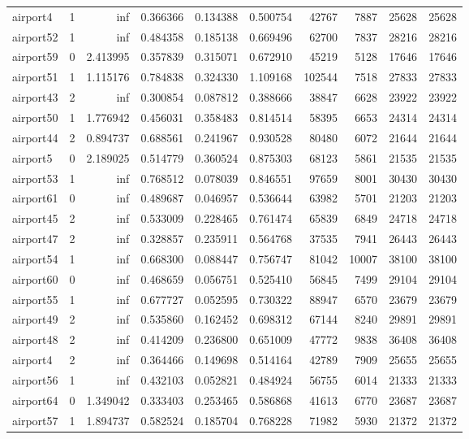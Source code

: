 \begin{longtable}{|l|r|r|r|r|r|r|r|r|r|}
airport4 & 1 & inf & 0.366366 & 0.134388 & 0.500754 & 42767 & 7887 & 25628 & 25628 \\
airport52 & 1 & inf & 0.484358 & 0.185138 & 0.669496 & 62700 & 7837 & 28216 & 28216 \\
airport59 & 0 & 2.413995 & 0.357839 & 0.315071 & 0.672910 & 45219 & 5128 & 17646 & 17646 \\
airport51 & 1 & 1.115176 & 0.784838 & 0.324330 & 1.109168 & 102544 & 7518 & 27833 & 27833 \\
airport43 & 2 & inf & 0.300854 & 0.087812 & 0.388666 & 38847 & 6628 & 23922 & 23922 \\
airport50 & 1 & 1.776942 & 0.456031 & 0.358483 & 0.814514 & 58395 & 6653 & 24314 & 24314 \\
airport44 & 2 & 0.894737 & 0.688561 & 0.241967 & 0.930528 & 80480 & 6072 & 21644 & 21644 \\
airport5 & 0 & 2.189025 & 0.514779 & 0.360524 & 0.875303 & 68123 & 5861 & 21535 & 21535 \\
airport53 & 1 & inf & 0.768512 & 0.078039 & 0.846551 & 97659 & 8001 & 30430 & 30430 \\
airport61 & 0 & inf & 0.489687 & 0.046957 & 0.536644 & 63982 & 5701 & 21203 & 21203 \\
airport45 & 2 & inf & 0.533009 & 0.228465 & 0.761474 & 65839 & 6849 & 24718 & 24718 \\
airport47 & 2 & inf & 0.328857 & 0.235911 & 0.564768 & 37535 & 7941 & 26443 & 26443 \\
airport54 & 1 & inf & 0.668300 & 0.088447 & 0.756747 & 81042 & 10007 & 38100 & 38100 \\
airport60 & 0 & inf & 0.468659 & 0.056751 & 0.525410 & 56845 & 7499 & 29104 & 29104 \\
airport55 & 1 & inf & 0.677727 & 0.052595 & 0.730322 & 88947 & 6570 & 23679 & 23679 \\
airport49 & 2 & inf & 0.535860 & 0.162452 & 0.698312 & 67144 & 8240 & 29891 & 29891 \\
airport48 & 2 & inf & 0.414209 & 0.236800 & 0.651009 & 47772 & 9838 & 36408 & 36408 \\
airport4 & 2 & inf & 0.364466 & 0.149698 & 0.514164 & 42789 & 7909 & 25655 & 25655 \\
airport56 & 1 & inf & 0.432103 & 0.052821 & 0.484924 & 56755 & 6014 & 21333 & 21333 \\
airport64 & 0 & 1.349042 & 0.333403 & 0.253465 & 0.586868 & 41613 & 6770 & 23687 & 23687 \\
airport57 & 1 & 1.894737 & 0.582524 & 0.185704 & 0.768228 & 71982 & 5930 & 21372 & 21372 \\

\end{longtable}
